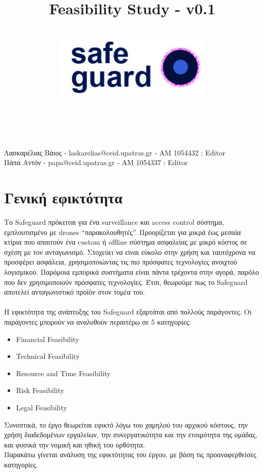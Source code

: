 \documentclass{article}
\title{Feasibility Study - v0.1}
\author{\\
\includegraphics[width=3in]{safeguard}\\[1ex]\\\\
}
\begin{document}
\maketitle
\newpage

\begin{center}
Λασκαρέλιας Βάιος - laskarelias@ceid.upatras.gr - ΑΜ 1054432 : Editor \\
Πάπα Αντόν - papa@ceid.upatras.gr - ΑΜ 1054337 : Editor
\end{center}
\renewcommand{\contentsname}{Περιεχόμενα}

\tableofcontents

\newpage
\thispagestyle{plain} %
\mbox{}
\newpage

\section{Γενική εφικτότητα}
Το Safeguard πρόκειται για ένα surveillance και access control σύστημα, εμπλουτισμένο με drones “παρακολουθητές”. Προορίζεται για μικρά έως μεσαία κτίρια που απαιτούν ένα custom ή offline σύστημα ασφαλείας με μικρό κόστος σε σχέση με τον ανταγωνισμό. Στοχεύει να είναι εύκολο στην χρήση και ταυτόχρονα να προσφέρει ασφάλεια, χρησιμοποιώντας τις πιο πρόσφατες τεχνολογίες ανοιχτού λογισμικού. Παρόμοια εμπορικά συστήματα είναι πάντα τρέχοντα στην αγορά, παρόλο που δεν χρησιμοποιούν πρόσφατες τεχνολογίες. Έτσι, θεωρούμε πως το Safeguard αποτελεί ανταγωνιστικό προϊόν στον τομέα του.\\ \\
Η εφικτότητα της ανάπτυξης του Safeguard εξαρτάται από πολλούς παράγοντες. Οι παράγοντες μπορούν να αναλυθούν περαιτέρω σε 5 κατηγορίες: \begin{itemize}
\item Financial Feasibility
\item Technical Feasibility
\item Resource and Time Feasibility
\item Risk Feasibility
\item Legal Feasibility
\end{itemize}

Συνοπτικά, το έργο θεωρείται εφικτό λόγω του χαμηλού του αρχικού κόστους, την χρήση διαδεδομένων εργαλείων, την συνεργατικότητα και την ετοιμότητα της ομάδας, και φυσικά την νομική και ηθική του ορθότητα. \\
	Παρακάτω γίνεται ανάλυση της εφικτότητας του έργου, με βάση τις προαναφερθείσες κατηγορίες.
\end{document}
